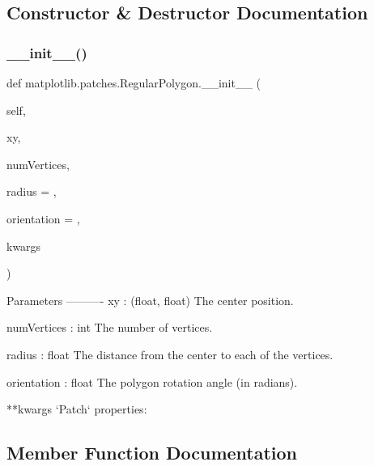 \subsection{Constructor \& Destructor Documentation}
\mbox{\label{classmatplotlib_1_1patches_1_1RegularPolygon_aa770673389a6fd439d99cafe62e8f63c}} 
\subsubsection{\texorpdfstring{\+\_\+\+\_\+init\+\_\+\+\_\+()}{\_\_init\_\_()}}
{\footnotesize\ttfamily def matplotlib.\+patches.\+Regular\+Polygon.\+\_\+\+\_\+init\+\_\+\+\_\+ (\begin{DoxyParamCaption}\item[{}]{self,  }\item[{}]{xy,  }\item[{}]{num\+Vertices,  }\item[{}]{radius = {},  }\item[{}]{orientation = {},  }\item[{}]{kwargs }\end{DoxyParamCaption})}

\begin{DoxyVerb}Parameters
----------
xy : (float, float)
    The center position.

numVertices : int
    The number of vertices.

radius : float
    The distance from the center to each of the vertices.

orientation : float
    The polygon rotation angle (in radians).

**kwargs
    `Patch` properties:

\end{DoxyVerb}
 

\subsection{Member Function Documentation}
\mbox{\label{classmatplotlib_1_1patches_1_1RegularPolygon_ae6fdda22fbd08cabc6d4b1734ecb566b}} 
